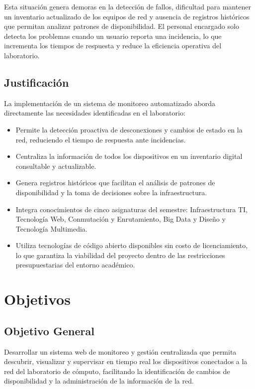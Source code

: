 \documentclass[12pt,a4paper]{report}
\begin{document}
Esta situación genera demoras en la detección de fallos, dificultad para mantener un inventario actualizado de los equipos de red y ausencia de registros históricos que permitan analizar patrones de disponibilidad. El personal encargado solo detecta los problemas cuando un usuario reporta una incidencia, lo que incrementa los tiempos de respuesta y reduce la eficiencia operativa del laboratorio.

\section{Justificación}

La implementación de un sistema de monitoreo automatizado aborda directamente las necesidades identificadas en el laboratorio:

\begin{itemize}
  \item Permite la detección proactiva de desconexiones y cambios de estado en la red, reduciendo el tiempo de respuesta ante incidencias.
  \item Centraliza la información de todos los dispositivos en un inventario digital consultable y actualizable.
  \item Genera registros históricos que facilitan el análisis de patrones de disponibilidad y la toma de decisiones sobre la infraestructura.
  \item Integra conocimientos de cinco asignaturas del semestre: Infraestructura TI, Tecnología Web, Conmutación y Enrutamiento, Big Data y Diseño y Tecnología Multimedia.
  \item Utiliza tecnologías de código abierto disponibles sin costo de licenciamiento, lo que garantiza la viabilidad del proyecto dentro de las restricciones presupuestarias del entorno académico.
\end{itemize}

\chapter{Objetivos}

\section{Objetivo General}

Desarrollar un sistema web de monitoreo y gestión centralizada que permita descubrir, visualizar y supervisar en tiempo real los dispositivos conectados a la red del laboratorio de cómputo, facilitando la identificación de cambios de disponibilidad y la administración de la información de la red.
\end{document}
